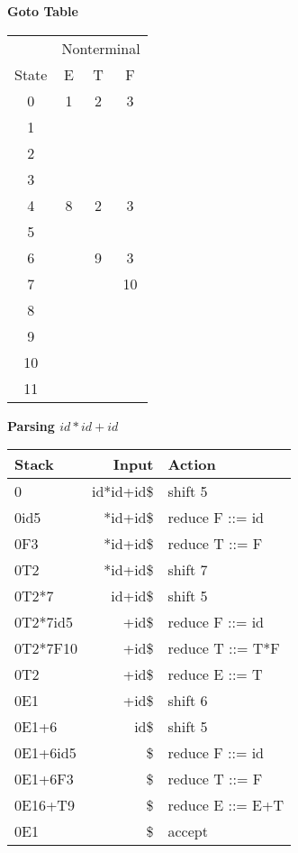 %
%
\begin{slide}{}
{\bf Goto Table}\\[0.5cm]               

\begin{tabular}{|c|c|c|c|}
\hline
       & \multicolumn{3}{|c|}{Nonterminal} \\
State  & E & T & F \\
\hline
0     & 1 & 2 & 3 \\
1     &   &   &   \\
2     &   &   &   \\
3     &   &   &   \\
4     & 8 & 2 & 3 \\
5     &   &   &   \\
6     &   & 9 & 3 \\
7     &   &   & 10 \\
8     &   &   &   \\
9     &   &   &   \\
10    &   &   &   \\
11    &   &   &   \\
\hline
\end{tabular}
\end{slide}
%
%
\begin{slide}{}
{\bf Parsing $ id * id + id $}\\[0.5cm]               

\begin{tabular}{|l|r|l|}
\hline
Stack         & Input      & Action \\
\hline
0             & id*id+id\$ & shift 5 \\
0id5          &   *id+id\$ & reduce F ::= id \\
0F3           &   *id+id\$ & reduce T ::= F \\
0T2           &   *id+id\$ & shift 7 \\
0T2*7         &    id+id\$ & shift 5 \\
0T2*7id5      &      +id\$ & reduce F ::= id \\
0T2*7F10      &      +id\$ & reduce T ::= T*F \\
0T2           &      +id\$ & reduce E ::= T \\
0E1           &      +id\$ & shift 6 \\
0E1+6         &       id\$ & shift 5 \\
0E1+6id5      &         \$ & reduce F ::= id \\
0E1+6F3       &         \$ & reduce T ::= F \\
0E16+T9       &         \$ & reduce E ::= E+T \\
0E1           &         \$ & accept \\
\hline
\end{tabular}
\end{slide}
